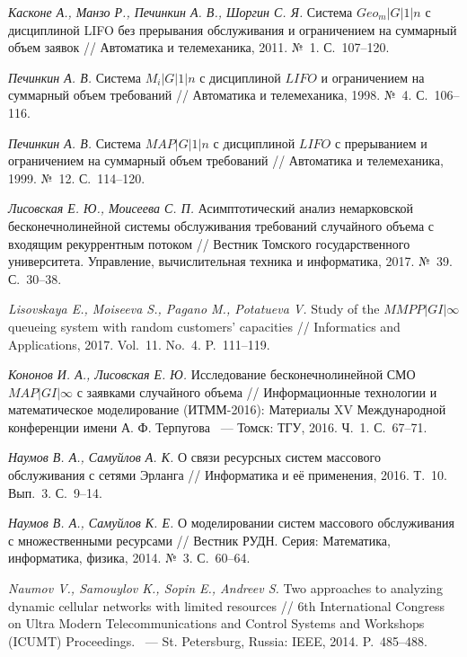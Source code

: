 \documentclass[a4paper,12pt]{article}
\begin{document}
\begin{enumerate}
\textit{Касконе А., Манзо Р., Печинкин А. В., Шоргин С. Я.}
Система $Geo_m|G|1|n$ с дисциплиной LIFO без прерывания обслуживания и ограничением на суммарный объем заявок // {Автоматика и телемеханика}, 2011. №~1. С.~107--120.

\textit{Печинкин А. В.}
Система $M_i|G|1|n$ с дисциплиной $LIFO$ и ограничением на суммарный объем требований // {Автоматика и телемеханика}, 1998. №~4. С.~106--116.

\textit{Печинкин А. В.}
Система $MAP|G|1|n$ с дисциплиной $LIFO$ с прерыванием и ограничением на суммарный объем требований // {Автоматика и телемеханика}, 1999. №~12. С.~114--120.

\textit{Лисовская Е. Ю., Моисеева С. П.}
Асимптотический анализ немарковской бесконечнолинейной системы обслуживания требований случайного объема с входящим рекуррентным потоком // {Вестник Томского государственного университета. Управление, вычислительная техника и информатика}, 2017. №~39. С.~30--38.

\textit{Lisovskaya E., Moiseeva S., Pagano M., Potatueva V.}
Study of the $MMPP|GI|\infty$ queueing system with random customers' capacities // {Informatics and Applications}, 2017. Vol.~11. No.~4. P.~111--119.

\textit{Кононов И. А., Лисовская Е. Ю.}
Исследование бесконечнолинейной СМО $MAP|GI|\infty$ с заявками случайного объема // {Информационные технологии и математическое моделирование (ИТММ-2016): Материалы XV Международной конференции имени А. Ф. Терпугова} ~--- Томск: ТГУ, 2016. Ч.~1. С.~67--71.

\textit{Наумов В. А., Самуйлов А. К.}
О связи ресурсных систем массового обслуживания с сетями Эрланга // {Информатика и её применения}, 2016. Т.~10. Вып.~3. С.~9--14.

\textit{Наумов В. А., Самуйлов К. Е.}
О моделировании систем массового обслуживания с множественными ресурсами // {Вестник РУДН. Серия: Математика, информатика, физика}, 2014. №~3. С.~60--64.

\textit{Naumov V., Samouylov K., Sopin E., Andreev S.}
Two approaches to analyzing dynamic cellular networks with limited resources // {6th International Congress on Ultra Modern Telecommunications and Control Systems and Workshops (ICUMT) Proceedings}. ~--- St. Petersburg, Russia: IEEE, 2014. P.~485--488.


\end{enumerate}
\end{document}
